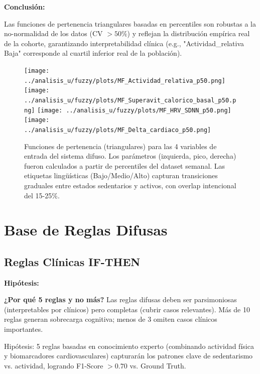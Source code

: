 \documentclass[12pt,letterpaper,twoside]{report}
\begin{document}
\begin{conclusionbox}
\textbf{Conclusión:}

Las funciones de pertenencia triangulares basadas en percentiles son robustas a la no-normalidad de los datos (CV $> 50\%$) y reflejan la distribución empírica real de la cohorte, garantizando interpretabilidad clínica (e.g., "Actividad\_relativa Baja" corresponde al cuartil inferior real de la población).
\end{conclusionbox}

\begin{figure}[htbp]
\centering
\texttt{[image: ../analisis\_u/fuzzy/plots/MF\_Actividad\_relativa\_p50.png]}
\texttt{[image: ../analisis\_u/fuzzy/plots/MF\_Superavit\_calorico\_basal\_p50.png]}
\texttt{[image: ../analisis\_u/fuzzy/plots/MF\_HRV\_SDNN\_p50.png]}
\texttt{[image: ../analisis\_u/fuzzy/plots/MF\_Delta\_cardiaco\_p50.png]}
\caption{Funciones de pertenencia (triangulares) para las 4 variables de entrada del sistema difuso. Los parámetros (izquierda, pico, derecha) fueron calculados a partir de percentiles del dataset semanal. Las etiquetas lingüísticas (Bajo/Medio/Alto) capturan transiciones graduales entre estados sedentarios y activos, con overlap intencional del 15-25\%.}
\label{fig:membership_functions}
\end{figure}

\section{Base de Reglas Difusas}

\subsection{Reglas Clínicas IF-THEN}

\begin{hipotesisbox}
\textbf{Hipótesis:}

\textbf{¿Por qué 5 reglas y no más?} Las reglas difusas deben ser parsimoniosas (interpretables por clínicos) pero completas (cubrir casos relevantes). Más de 10 reglas generan sobrecarga cognitiva; menos de 3 omiten casos clínicos importantes.

Hipótesis: 5 reglas basadas en conocimiento experto (combinando actividad física y biomarcadores cardiovasculares) capturarán los patrones clave de sedentarismo vs. actividad, logrando F1-Score $> 0.70$ vs. Ground Truth.
\end{hipotesisbox}
\end{document}
